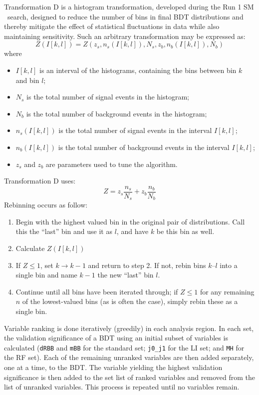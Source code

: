 Transformation D is a histogram transformation, developed during the Run 1 SM \vhbb\, search, designed to reduce the number of bins in final BDT distributions and thereby mitigate the effect of statistical fluctuations in data while also maintaining sensitivity.  Such an arbitrary transformation may be expressed as:
\begin{equation}
Z\left(I\left[k,l\right]\right) = Z\left(z_s,n_s\left(I\left[k,l\right]\right),N_s,z_b,n_b\left(I\left[k,l\right]\right),N_b\right)
\end{equation}
where
\begin{itemize}
\item $I[k,l]$ is an interval of the histograms, containing the bins between bin $k$ and bin $l$;
\item $N_{s}$ is the total number of signal events in the histogram;
\item $N_{b}$ is the total number of background events in the histogram;
\item $n_{s}(I[k,l])$ is the total number of signal events in the interval $I[k,l]$;
\item $n_{b}(I[k,l])$ is the total number of background events in the interval $I[k,l]$;
\item $z_{s}$ and $z_{b}$ are parameters used to tune the algorithm.
\end{itemize}
Transformation D uses:
\begin{equation}
Z = z_{s}\frac{n_{s}}{N_{s}} + z_{b}\frac{n_{b}}{N_{b}}
\end{equation}
Rebinning occurs as follow:
\begin{enumerate}
\item Begin with the highest valued bin in the original pair of distributions.  Call this the ``last'' bin and use it as $l$, and have $k$ be this bin as well.
\item Calculate $Z\left(I\left[k,l\right]\right)$
\item If $Z\le1$, set $k\to k-1$ and return to step 2.  If not, rebin bins $k$--$l$ into a single bin and name $k-1$ the new ``last'' bin $l$.
\item Continue until all bins have been iterated through; if $Z\le1$ for any remaining $n$ of the lowest-valued bins (as is often the case), simply rebin these as a single bin.
\end{enumerate}

Variable ranking is done iteratively (greedily) in each analysis region.  In each set, the validation significance of a BDT using an initial subset of variables is calculated (\texttt{dRBB} and \texttt{mBB} for the standard set; \texttt{j0\_j1} for the LI set; and \texttt{MH} for the RF set).  Each of the remaining unranked variables are then added separately, one at a time, to the BDT.  The variable yielding the highest validation significance is then added to the set list of ranked variables and removed from the list of unranked variables.  This process is repeated until no variables remain.  

